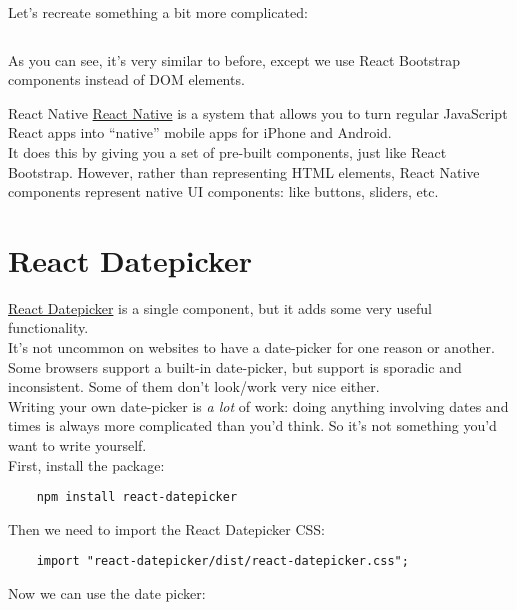 Let's recreate something a bit more complicated:

\inputminted{js}{08-pre-built-components/figures/01-Figure.js}

As you can see, it's very similar to before, except we use React Bootstrap components instead of DOM elements.


\begin{infobox}{React Native}
    \href{https://facebook.github.io/react-native/}{React Native} is a system that allows you to turn regular JavaScript React apps into ``native'' mobile apps for iPhone and Android.
    \\

    It does this by giving you a set of pre-built components, just like React Bootstrap. However, rather than representing HTML elements, React Native components represent native UI components: like buttons, sliders, etc.
\end{infobox}


\section{React Datepicker}

\href{https://github.com/Hacker0x01/react-datepicker/}{React Datepicker} is a single component, but it adds some very useful functionality.
\\

It's not uncommon on websites to have a date-picker for one reason or another. Some browsers support a built-in date-picker, but support is sporadic and inconsistent. Some of them don't look/work very nice either.
\\

Writing your own date-picker is \textit{a lot} of work: doing anything involving dates and times is always more complicated than you'd think. So it's not something you'd want to write yourself.
\\

First, install the package:

\begin{verbatim}
    npm install react-datepicker
\end{verbatim}

Then we need to import the React Datepicker CSS:

\begin{verbatim}
    import "react-datepicker/dist/react-datepicker.css";
\end{verbatim}

Now we can use the date picker:

